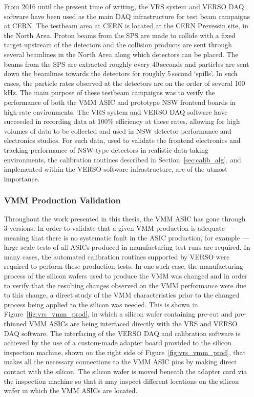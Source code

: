 From 2016 until the present time of writing, the VRS system and VERSO DAQ software have been used as the main DAQ infrastructure
for test beam campaigns at CERN.
The testbeam area at CERN is located at the CERN Prevessin site, in the North Area.
Proton beams from the SPS are made to collide with a fixed target upstream of the detectors and
the collision products are sent through several beamlines in the North Area along which
detectors can be placed.
The beams from the SPS are extracted roughly every 40\,seconds and particles are sent down the beamlines towards
the detectors for roughly 5\,second `spills'.
In such cases, the particle rates observed at the detectors are on the order of several 100\,kHz.
The main purpose of these testbeam campaigns was to verify the performance of both the VMM ASIC and prototype NSW frontend
boards in high-rate environments.
The VRS system and VERSO DAQ software have succeeded in recording data at 100\% efficiency at these
rates, allowing for high volumes of data to be collected and used in NSW detector performance and electronics studies.
For such data, used to validate the frontend electronics and tracking performance of NSW-type detectors in realistic data-taking environments,
the calibration routines described in Section~\ref{sec:calib_alg}, and implemented within the VERSO software infrastructure, are of the utmost importance.

\subsubsection{VMM Production Validation}
\label{sec:verso_vmm_prod}

Throughout the work presented in this thesis, the VMM ASIC has gone through 3 versions.
In order to validate that a given VMM production is adequate --- meaning that there is no systematic
fault in the ASIC production, for example --- large scale tests of all ASICs produced in manufacturing test runs 
are required.
In many cases, the automated calibration routines supported by VERSO were required to perform these production
tests.
In one such case, the manufacturing process of the silicon wafers used to produce the VMM was changed
and in order to verify that the resulting changes observed on the VMM performance were due to this
change, a direct study of the VMM characteristics prior to the changed process being applied
to the silicon was needed.
This is shown in Figure~\ref{fig:vrs_vmm_prod}, in which a silicon wafer containing pre-cut and pre-thinned
VMM ASICs are being interfaced directly with the VRS and VERSO DAQ software.
The interfacing of the VERSO DAQ and calibration software is achieved by the use of a custom-made
adapter board provided to the silicon inspection machine, shown on the right side of Figure~\ref{fig:vrs_vmm_prod}, that makes all the necessary
connections to the VMM ASIC pins by making direct contact with the silicon.
The silicon wafer is moved beneath the adapter card via the inspection machine
so that it may inspect different locations on the silicon wafer in which the VMM ASICs are located.


